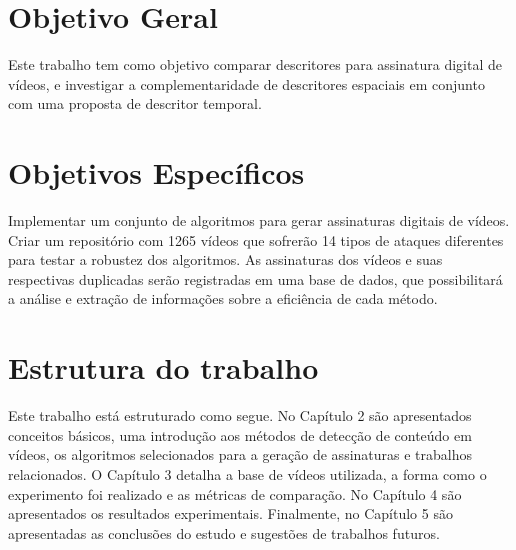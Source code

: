 
\section{Objetivo Geral}
\label{sec:objetivos}
Este trabalho tem como objetivo comparar descritores para assinatura digital de vídeos, e investigar a complementaridade de descritores espaciais em conjunto com uma proposta de descritor temporal.

\section{Objetivos Específicos}

Implementar um conjunto de algoritmos para gerar assinaturas digitais de vídeos. Criar um repositório com 1265 vídeos que sofrerão 14 tipos de ataques diferentes para testar a robustez dos algoritmos. As assinaturas dos vídeos e suas respectivas duplicadas serão registradas em  uma base de dados, que possibilitará a análise e extração de informações sobre a eficiência de cada método. %

\section{Estrutura do trabalho}
Este trabalho está estruturado como segue. No Capítulo 2 são apresentados conceitos básicos, uma introdução aos métodos de detecção de conteúdo em vídeos, os algoritmos selecionados para a geração de assinaturas e trabalhos relacionados. O Capítulo 3 detalha a base de vídeos utilizada, a forma como o experimento foi realizado e as métricas de comparação. No Capítulo 4 são apresentados os resultados experimentais. Finalmente, no Capítulo 5 são apresentadas as conclusões do estudo e sugestões de trabalhos futuros.















